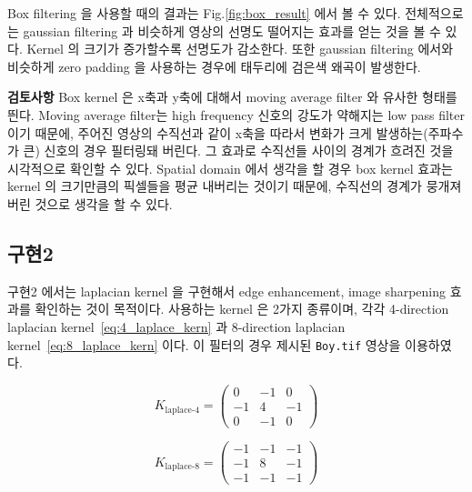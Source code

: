 \documentclass[a4paper, 12p]{paper}
\def\code#1{\texttt{#1}}
\begin{document}
Box filtering 을 사용할 때의 결과는 Fig.\ref{fig:box_result} 에서 볼 수 있다. 전체적으로는 gaussian filtering 과 비슷하게 영상의 선명도 떨어지는 효과를 얻는 것을 볼 수 있다. Kernel 의 크기가 증가할수록 선명도가 감소한다. 또한 gaussian filtering 에서와 비슷하게 zero padding 을 사용하는 경우에 태두리에 검은색 왜곡이 발생한다.

\textbf{검토사항} Box kernel 은 x축과 y축에 대해서 moving average filter 와 유사한 형태를 띈다. Moving average filter는 high frequency 신호의 강도가 약해지는 low pass filter 이기 때문에, 주어진 영상의 수직선과 같이 x축을 따라서 변화가 크게 발생하는(주파수가 큰) 신호의 경우 필터링돼 버린다. 그 효과로 수직선들 사이의 경계가 흐려진 것을 시각적으로 확인할 수 있다. Spatial domain 에서 생각을 할 경우 box kernel 효과는 kernel 의 크기만큼의 픽셀들을 평균 내버리는 것이기 때문에, 수직선의 경계가 뭉개져 버린 것으로 생각을 할 수 있다.

\subsection{구현2}
구현2 에서는 laplacian kernel 을 구현해서 edge enhancement, image sharpening 효과를 확인하는 것이 목적이다. 사용하는 kernel 은 2가지 종류이며, 각각 4-direction laplacian kernel~\ref{eq:4_laplace_kern} 과 8-direction laplacian kernel~\ref{eq:8_laplace_kern} 이다. 이 필터의 경우 제시된 \code{Boy.tif} 영상을 이용하였다.

\begin{equation}
  K_{\text{laplace-4}} =
  \begin{pmatrix}
     0  & -1 & 0 \\
     -1 &  4 & -1 \\
     0  & -1 & 0 
  \end{pmatrix}\label{eq:4_laplace_kern}
\end{equation}

\begin{equation}
  K_{\text{laplace-8}} =
  \begin{pmatrix}
     -1  & -1 & -1 \\
     -1  &  8 & -1 \\
     -1  & -1 & -1 
  \end{pmatrix}\label{eq:8_laplace_kern}
\end{equation}
\end{document}
